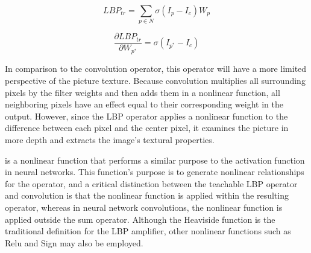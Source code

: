 \documentclass[journal]{IEEEtran}
\begin{document}
\begin{equation}\label{eq:lbptrlin}
	LBP_{tr}=\sum_{p\in N}\sigma(I_p-I_c)W_p 
\end{equation}

\begin{equation}\label{eq:lbptrlindif}
	\frac{\partial LBP_{tr}}{\partial W_{p^*}}=
	\sigma(I_{p^*}-I_c)
\end{equation}

In comparison to the convolution operator, this operator will have a more limited perspective of the picture texture.
Because convolution multiplies all surrounding pixels by the filter weights and then adds them in a nonlinear function, all neighboring pixels have an effect equal to their corresponding weight in the output. However, since the LBP operator applies a nonlinear function to the difference between each pixel and the center pixel, it examines the picture in more depth and extracts the image's textural properties.

is a nonlinear function that performs a similar purpose to the activation function in neural networks. This function's purpose is to generate nonlinear relationships for the operator, and a critical distinction between the teachable LBP operator and convolution is that the nonlinear function is applied within the resulting operator, whereas in neural network convolutions, the nonlinear function is applied outside the sum operator.
Although the Heaviside function is the traditional definition for the LBP amplifier, other nonlinear functions such as Relu and Sign may also be employed.
\end{document}
